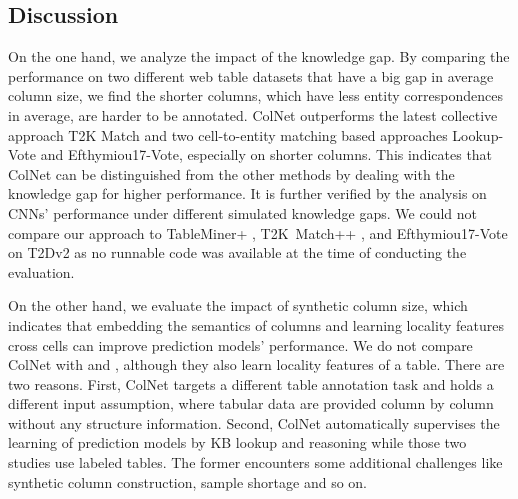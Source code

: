 \documentclass[letterpaper]{article}
\newcommand{\ernesto}[1]{{\color{black}#1}}
\newcommand{\rv}[1]{{\color{black}#1}}
\newcommand{\camera}[1]{{\color{black}#1}}
\newcommand{\ColNet}{\textsf{ColNet}\xspace}
\begin{document}
\subsection{Discussion}

On the one hand, \rv{we analyze the impact of the knowledge gap}.
By comparing the performance on two different web table datasets that have a big gap in average column size,
we find the shorter columns, \rv{which have less entity correspondences in average}, are harder to be annotated.
\ColNet outperforms the latest collective approach T2K Match and two cell-to-entity matching based approaches Lookup-Vote and Efthymiou17-Vote, 
especially on shorter columns.
This indicates that \ColNet can be distinguished from \rv{the other methods by dealing with the knowledge gap for higher performance.
It is further verified by the analysis on CNNs' performance under different simulated knowledge gaps.}
\ernesto{We could not compare our approach to TableMiner+ \cite{zhang2017effective}, T2K~Match++ \cite{ritze2017web}, and Efthymiou17-Vote on T2Dv2 \cite{efthymiou2017matching} as no runnable code was available at the time of conducting the evaluation.
}

On the other hand, we evaluate the impact of synthetic column size, 
which \camera{indicates}
that embedding the semantics of columns and learning locality features cross cells can improve prediction models' performance. 
We do not compare \ColNet with \cite{nishida2017understanding} and \cite{luo2018cross}, 
although they also learn locality features of \rv{a table}.
There are two reasons.
First, \ColNet targets a different table annotation task 
and holds a different input assumption, 
where tabular data are provided column by column \rv{without any structure information}.
Second, \ColNet automatically supervises the learning of prediction models by KB lookup and reasoning while those two studies use labeled tables.
The former encounters some additional challenges like synthetic column construction, sample shortage and so on.
\end{document}
